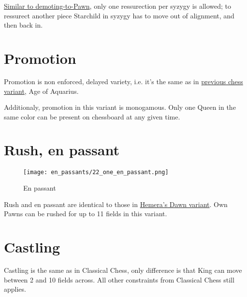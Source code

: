 \clearpage %

\hyperref[fig:scn_d_16_syzygy_2_stars_steps]{Similar to demoting-to-Pawn}, only one ressurection per syzygy is
allowed; to ressurect another piece Starchild in syzygy has to move out of alignment, and then back in.

\section*{Promotion}
\label{sec:One/Promotion}

Promotion is non enforced, delayed variety, i.e. it's the same as in
\hyperref[sec:Age of Aquarius/Promotion]{previous chess variant}, Age of Aquarius.

Additionaly, promotion in this variant is monogamous.
Only one Queen in the same color can be present on chessboard at any given time.

\clearpage %

\section*{Rush, en passant}

\vspace*{-1.2\baselineskip}
\noindent
\begin{figure}[!h]
\texttt{[image: en\_passants/22\_one\_en\_passant.png]}
\caption{En passant}
\label{fig:22_one_en_passant}
\end{figure}

Rush and en passant are identical to those in \hyperref[fig:14_hemera_s_dawn_en_passant]{Hemera's Dawn variant}.
Own Pawns can be rushed for up to 11 fields in this variant.

\clearpage %

\section*{Castling}

Castling is the same as in Classical Chess, only difference is that King can move between 2 and 10 fields across.
All other constraints from Classical Chess still applies.

